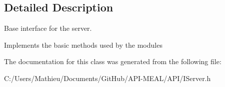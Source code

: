 \subsection{Detailed Description}
Base interface for the server. 

Implements the basic methods used by the modules 

The documentation for this class was generated from the following file\+:\begin{DoxyCompactItemize}
\item 
C\+:/\+Users/\+Mathieu/\+Documents/\+Git\+Hub/\+A\+P\+I-\/\+M\+E\+A\+L/\+A\+P\+I/I\+Server.\+h\end{DoxyCompactItemize}
